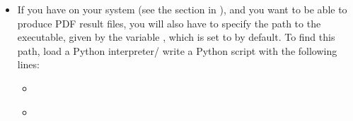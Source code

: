\documentclass[letterpaper,10pt,english]{sphinxmanual}
\begin{document}
\begin{itemize}
\item {} 
\sphinxAtStartPar
{}

\sphinxAtStartPar
If you have  on your system (see the  section in
{\hyperref[\detokenize{install::doc}]{}}), and you want to be able to produce
PDF result files, you will also have to specify the path to the
 executable, given by the variable , which
is set to  by default. To find this path, load a Python interpreter/
write a Python script with the following lines:
\begin{itemize}
\item {} 
\sphinxAtStartPar
{}

\begin{sphinxVerbatim}[commandchars=\\\{\}]
     
   
   
\end{sphinxVerbatim}

\item {} 
\sphinxAtStartPar
{}


\end{itemize}
\end{itemize}
\end{document}
